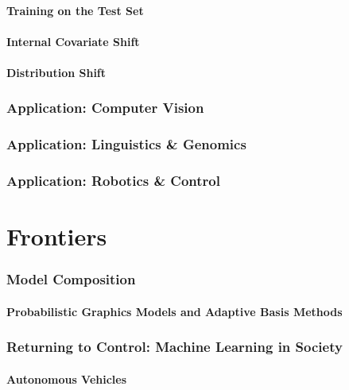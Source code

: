 \documentclass[10pt]{article}
\begin{document}
\subsection{Training on the Test Set}

\subsection{Internal Covariate Shift}

\subsection{Distribution Shift}

\section{Application: Computer Vision}

\section{Application: Linguistics \& Genomics}

\section{Application: Robotics \& Control}

\newpage

\part{Frontiers}

\section{Model Composition}

\subsection{Probabilistic Graphics Models and Adaptive Basis Methods}

\section{Returning to Control: Machine Learning in Society}

\subsection{Autonomous Vehicles}
\end{document}
